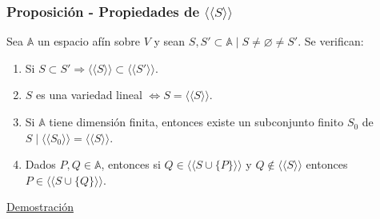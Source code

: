 \documentclass[12pt, a4paper, ones, notitlepage, openany,titlepage]{article}
\begin{document}
\subsubsection{Proposición - Propiedades de $\langle\langle S\rangle\rangle$}
\noindent Sea $\mathbb{A}$ un espacio afín sobre $V$ y sean $S, S' \subset \mathbb{A} \mid S \neq \varnothing \neq S'$. Se verifican:
\begin{enumerate}[label=(\alph*)]
	\item Si $S \subset S' \Longrightarrow \langle\langle S \rangle\rangle \subset \langle\langle S' \rangle\rangle$.
	\item $S$ es una variedad lineal $\Longleftrightarrow S = \langle\langle S \rangle\rangle$.
	\item Si $\mathbb{A}$ tiene dimensión finita, entonces existe un subconjunto finito $S_0$ de $S \mid \langle\langle S_0 \rangle\rangle = \langle\langle S \rangle\rangle$.
	\item Dados $P, Q \in \mathbb{A}$, entonces si $Q \in \langle\langle S \cup \{P\} \rangle\rangle$ y $Q \notin \langle\langle S \rangle\rangle$ entonces $P \in \langle\langle S \cup \{Q\}\rangle\rangle$.
\end{enumerate}
\noindent\underline{Demostración}
\end{document}

